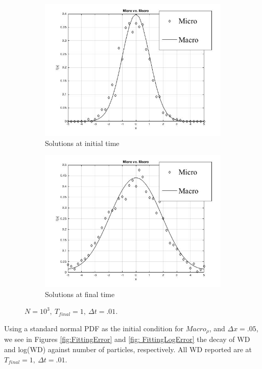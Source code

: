 \documentclass[10pt]{article}
\begin{document}
\begin{figure}[H]
\centering
\begin{subfigure}{.5\textwidth}
  \centering
  \includegraphics[width=.9\linewidth]{InitialDistributions.jpg}
  \caption{Solutions at initial time}
  \label{fig: rhoInitial}
\end{subfigure}%
\begin{subfigure}{.5\textwidth}
  \centering
  \includegraphics[width=.9\linewidth]{FinalDistribution.jpg}
  \caption{Solutions at final time}
  \label{fig: rhoFinal}
\end{subfigure}
\caption{$N = 10^3, \ T_{final} = 1, \ \Delta t =.01.$}
\label{fig:test}
\end{figure}

\noindent Using a standard normal PDF as the initial condition for $Macro_{\rho}$, and $\Delta x = .05$, we see in Figures \ref{fig:FittingError} and \ref{fig: FittingLogError} the decay of WD and log(WD) against number of particles, respectively.  All WD reported are at $T_{final} = 1, \ \Delta t = .01.$
\end{document}
